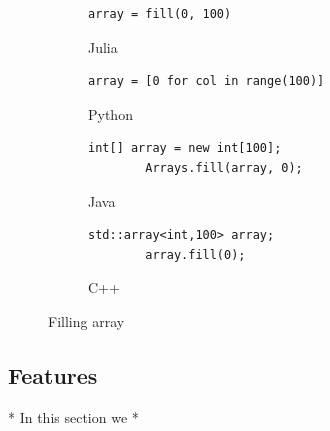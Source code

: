 \documentclass[a4paper, 11pt, titlepage]{article}
\begin{document}
\begin{figure}[H]
	\centering
	\begin{subfigure}[H]{0.7\textwidth}
		\centering
		\begin{lstlisting}[belowskip=0.5mm]
		array = fill(0, 100)
		\end{lstlisting}
		\caption{Julia}
	\end{subfigure}
	\begin{subfigure}[H]{0.7\textwidth}
		\centering
		\begin{lstlisting}[belowskip=0.5mm]
		array = [0 for col in range(100)]
		\end{lstlisting}
		\caption{Python}
	\end{subfigure}	
	\begin{subfigure}[H]{0.7\textwidth}
		\centering
		\begin{lstlisting}[belowskip=0.5mm]
		int[] array = new int[100];
		Arrays.fill(array, 0);
		\end{lstlisting}
		\caption{Java}
	\end{subfigure}
	\begin{subfigure}[H]{0.7\textwidth}
		\centering
		\begin{lstlisting}[belowskip=0.5mm]
		std::array<int,100> array;
		array.fill(0);
		\end{lstlisting}
		\caption{C++}
	\end{subfigure}
	\caption{Filling array}
	\label{Filling array with 0's}
\end{figure}

\subsection{Features}
* In this section we *
\end{document}
